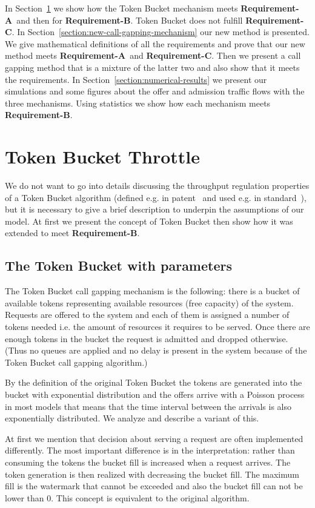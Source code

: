 \documentclass[conference]{IEEEtran}
\newcommand{\reqA}{\textbf{Requirement-A}}
\newcommand{\reqB}{\textbf{Requirement-B}}
\newcommand{\reqC}{\textbf{Requirement-C}}
\begin{document}
In Section~\ref{section:token-bucket-throttle} we show how the Token
Bucket mechanism meets \reqA\ and then for \reqB. Token Bucket does
not fulfill \reqC. In
Section~\ref{section:new-call-gapping-mechanism} our new method is
presented. We give mathematical definitions of all the requirements
and prove that our new method meets \reqA\ and \reqC. Then we
present a call gapping method that is a mixture of the latter two
and also show that it meets the requirements. In
Section~\ref{section:numerical-results} we present our simulations
and some figures about the offer and admission traffic flows with
the three mechanisms. Using statistics we show how each mechanism
meets \reqB.

\section{Token Bucket Throttle}\label{section:token-bucket-throttle}
We do not want to go into details discussing the throughput
regulation properties of a Token Bucket algorithm (defined e.g. in
patent~\cite{TBLBW} and used e.g. in standard~\cite{H.248.11}), but
it is necessary to give a brief description to underpin the
assumptions of our model. At first we present the concept of Token
Bucket then show how it was extended to meet \reqB.

\subsection{The Token Bucket with parameters }
The Token Bucket call gapping mechanism is the following: there is a
bucket of available tokens representing available resources (free
capacity) of the system. Requests are offered to the system and each
of them is assigned a number of tokens needed i.e. the amount of
resources it requires to be served. Once there are enough tokens in
the bucket the request is admitted and dropped otherwise. (Thus no
queues are applied and no delay is present in the system because of
the Token Bucket call gapping algorithm.)

By the definition of the original Token Bucket the tokens are
generated into the bucket with exponential distribution and the
offers arrive with a Poisson process in most models that means that
the time interval between the arrivals is also exponentially
distributed. We analyze and describe a variant of this.

At first we mention that decision about serving a request are often
implemented differently. The most important difference is in the
interpretation: rather than consuming the tokens the bucket fill 
is increased when a request arrives. The token generation is then
realized with decreasing the bucket fill. The maximum fill is the
watermark  that cannot be exceeded and also the bucket fill can
not be lower than 0. This concept is equivalent to the original
algorithm.
\end{document}
